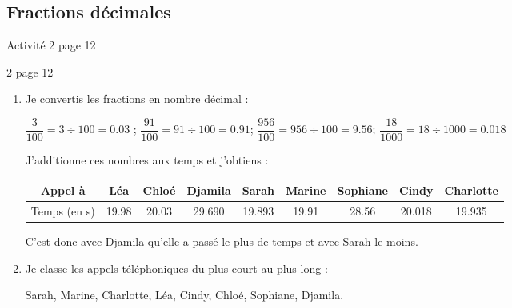 \subsection{Fractions décimales}



\begin{myact}{3}
	Activité 2 page 12
\end{myact}


\begin{myactrep}{2 page 12}
	\begin{enumerate}
		\item Je convertis les fractions en nombre décimal :
		
		$ \dfrac{3}{100} = 3 \div 100 = \num{0.03}$ ; $\dfrac{91}{100} = 91 \div 100 = \num{0.91}$; $\dfrac{956}{100} = 956 \div 100 = \num{9.56}$; $\dfrac{18}{1000} = 18 \div 1000 = \num{0.018}$
		
		J'additionne ces nombres aux temps et j'obtiens :
		
		\begin{tabular}{|@{\ }c@{\ }|@{\ }c@{\ }|@{\ }c@{\ }|@{\ }c@{\ }|@{\ }c@{\ }|@{\ }c@{\ }|@{\ }c@{\ }|@{\ }c@{\ }|@{\ }c@{\ }|}
			\hline
			Appel à      & Léa         & Chloé       & Djamila      & Sarah        & Marine      & Sophiane    & Cindy        & Charlotte    \\ \hline
			Temps (en s) & \num{19.98} & \num{20.03} & \num{29.690} & \num{19.893} & \num{19.91} & \num{28.56} & \num{20.018} & \num{19.935} \\ \hline
		\end{tabular}
		
		C'est donc avec Djamila qu'elle a passé le plus de temps et avec Sarah le moins.
		
		\item Je classe les appels téléphoniques du plus court au plus long :
		
		Sarah, Marine, Charlotte, Léa, Cindy, Chloé, Sophiane, Djamila.
	\end{enumerate}
\end{myactrep}


